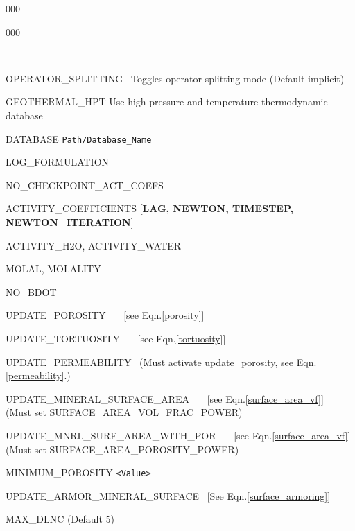 \documentclass[12pt]{article}
\begin{document}
\begin{deflist}{000}
\begin{deflist}{000}
\item [\keyend]
~\\
\item [OPERATOR\_SPLITTING] \ Toggles operator-splitting mode (Default implicit)
~\\
\item[GEOTHERMAL\_HPT] Use high pressure and temperature thermodynamic database
\item[DATABASE] {\tt Path/Database\_Name}
\item[LOG\_FORMULATION]
\item[NO\_CHECKPOINT\_ACT\_COEFS]
\item[ACTIVITY\_COEFFICIENTS] [{\bf LAG, NEWTON, TIMESTEP, NEWTON\_ITERATION}]
\item[ACTIVITY\_H2O, ACTIVITY\_WATER]
\item[MOLAL, MOLALITY]
\item[NO\_BDOT] 
\item[UPDATE\_POROSITY]  \ \ \ [see Eqn.\eqref{porosity}]
\item[UPDATE\_TORTUOSITY]  \ \ \ [see Eqn.\eqref{tortuosity}]
\item[UPDATE\_PERMEABILITY] \ (Must activate update\_porosity, see Eqn.\eqref{permeability}.)
\item[UPDATE\_MINERAL\_SURFACE\_AREA] \ \ \ [see Eqn.\eqref{surface_area_vf}]\\
(Must set SURFACE\_AREA\_VOL\_FRAC\_POWER)
\item[UPDATE\_MNRL\_SURF\_AREA\_WITH\_POR] \ \ \ [see Eqn.\eqref{surface_area_vf}]\\
(Must set SURFACE\_AREA\_POROSITY\_POWER)
\item[MINIMUM\_POROSITY] {\tt <Value>}
\item[UPDATE\_ARMOR\_MINERAL\_SURFACE] \ [See Eqn.\eqref{surface_armoring}]
\item[MAX\_DLNC] \rm (Default 5)

~\\


\end{deflist}
\end{deflist}
\end{document}
